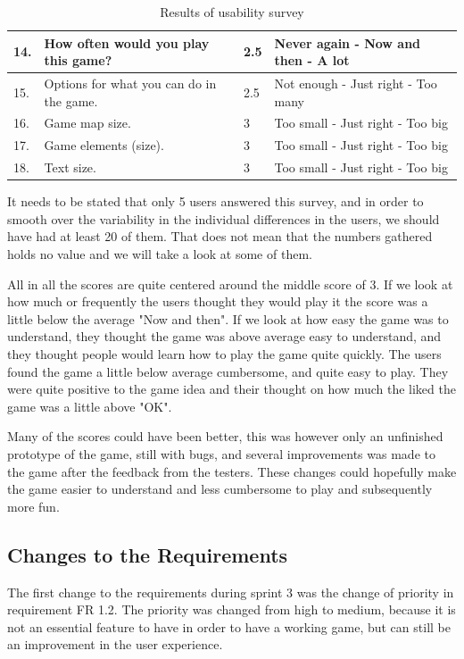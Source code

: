 \begin{table}[H]
\begin{tabular}{| l | p{5cm} | p{1cm} | p{5cm} |}
		14. & How often would you play this game? & 2.5 & Never again - Now and then - A lot \\ \hline

		15. & Options for what you can do in the game. & 2.5 & Not enough - Just right - Too many \\ \hline

		16. & Game map size. & 3 & Too small - Just right - Too big \\ \hline

		17. & Game elements (size). & 3 & Too small - Just right - Too big \\ \hline

		18. & Text size. & 3 & Too small - Just right - Too big \\ \hline
	\end{tabular}
	\caption{Results of usability survey}
	\end{table}

	It needs to be stated that only 5 users answered this survey, and in order to smooth over the 
	variability in the individual differences in the users, we should have had at least 20 of them. 
	\cite{quantitativeTest} That does not mean that the numbers gathered holds no value and we will take a look at some of them. 

	All in all the scores are quite centered around the middle score of 3. If we look at how much or frequently the users thought they would play it the score was a little below the average "Now and then". If we look at how easy the game was to understand, they thought the game was above average easy to understand, and they thought people would learn how to play the game quite quickly. The users found the game a little below average cumbersome, and quite easy to play. They were quite positive to the game idea and their thought on how much the liked the game was a little above "OK".

	Many of the scores could have been better, this was however only an unfinished prototype of the game, still with bugs, and several improvements was made to the game after the feedback from the testers. These changes could hopefully make the game easier to understand and less cumbersome to play and subsequently more fun.

\subsection{Changes to the Requirements}

	The first change to the requirements during sprint 3 was the change of priority in requirement FR 1.2. The priority was changed from high to medium, because it is not an essential feature to have in order to have a working game, but can still be an improvement in the user experience.

